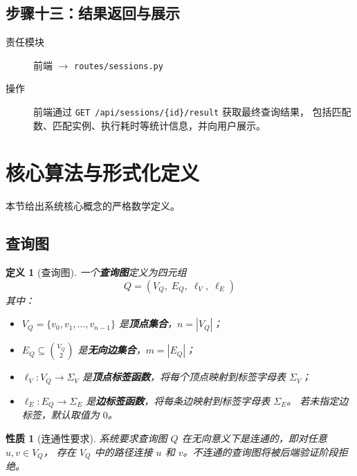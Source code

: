 \documentclass[12pt,a4paper]{article}
\newtheorem{definition}{定义}[section]
\newtheorem{property}{性质}[section]
\begin{document}
\subsection{步骤十三：结果返回与展示}
\begin{description}
  \item[责任模块] 前端 $\to$ \texttt{routes/sessions.py}
  \item[操作] 前端通过 \texttt{GET /api/sessions/\{id\}/result} 获取最终查询结果，
        包括匹配数、匹配实例、执行耗时等统计信息，并向用户展示。
\end{description}

\section{核心算法与形式化定义}
\label{sec:formal}

本节给出系统核心概念的严格数学定义。

\subsection{查询图}
\label{sec:formal-query-graph}

\begin{definition}[查询图]
\label{def:query-graph}
一个\textbf{查询图}定义为四元组
\[
  Q = (V_Q,\; E_Q,\; \ell_V,\; \ell_E)
\]
其中：
\begin{itemize}
  \item $V_Q = \{v_0, v_1, \dots, v_{n-1}\}$ 是\textbf{顶点集合}，$n = |V_Q|$；
  \item $E_Q \subseteq \binom{V_Q}{2}$ 是\textbf{无向边集合}，$m = |E_Q|$；
  \item $\ell_V: V_Q \to \Sigma_V$ 是\textbf{顶点标签函数}，将每个顶点映射到标签字母表 $\Sigma_V$；
  \item $\ell_E: E_Q \to \Sigma_E$ 是\textbf{边标签函数}，将每条边映射到标签字母表 $\Sigma_E$。
        若未指定边标签，默认取值为 $0$。
\end{itemize}
\end{definition}

\begin{property}[连通性要求]
系统要求查询图 $Q$ 在无向意义下是连通的，即对任意 $u, v \in V_Q$，
存在 $V_Q$ 中的路径连接 $u$ 和 $v$。不连通的查询图将被后端验证阶段拒绝。
\end{property}
\end{document}

